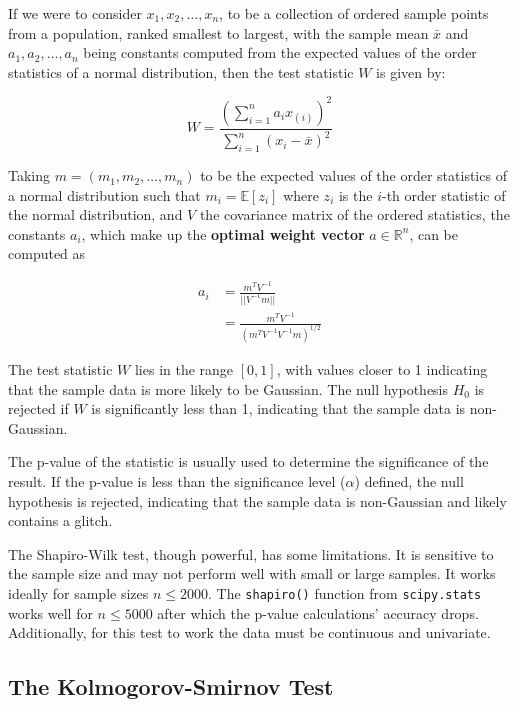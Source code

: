 \documentclass[12pt]{article}
\begin{document}
\medskip
\noindent If we were to consider $x_1, x_2, \ldots, x_n$, to be a collection of ordered sample points from a population, ranked smallest to largest, with the sample mean $\bar{x}$ and $a_1, a_2, \ldots, a_n$ being constants computed from the expected values of the order statistics of a normal distribution, then the test statistic $W$ is given by:

\begin{equation}
    W = \frac{(\sum\limits_{i=1}^{n} a_i x_{(i)})^2}{\sum\limits_{i=1}^{n} (x_i - \bar{x})^2}
    \label{eq:shapiro_wilk_statistic}
\end{equation}

\medskip
\noindent Taking $m = (m_1, m_2, \ldots, m_n)$ to be the expected values of the order statistics of a normal distribution such that $m_i = \mathbb{E}[z_i]$ where $z_i$ is the $i$-th order statistic of the normal distribution, and $V$ the covariance matrix of the ordered statistics, the constants $a_i$, which make up the \textbf{optimal weight vector} $a \in \mathbb{R}^n$, can be computed as

\begin{align}
    a_i &= \frac{m^T V^{-1}}{||V^{-1} m||} \\
        &= \frac{m^T V^{-1}}{(m^T V^{-1}V^{-1}m)^{1/2}}
    \label{eq:shapiro_wilk_constants}
\end{align}

\medskip
\noindent The test statistic $W$ lies in the range $[0, 1]$, with values closer to 1 indicating that the sample data is more likely to be Gaussian. The null hypothesis $H_0$ is rejected if $W$ is significantly less than 1, indicating that the sample data is non-Gaussian.

\medskip
\noindent The p-value of the statistic is usually used to determine the significance of the result. If the p-value is less than the significance level ($\alpha$) defined, the null hypothesis is rejected, indicating that the sample data is non-Gaussian and likely contains a glitch.

\medskip
\noindent The Shapiro-Wilk test, though powerful, has some limitations. It is sensitive to the sample size and may not perform well with small or large samples. It works ideally for sample sizes $n \leq 2000$. The \texttt{shapiro()} function from \texttt{scipy.stats} works well for $n \leq 5000$ after which the p-value calculations' accuracy drops. Additionally, for this test to work the data must be continuous and univariate.

\subsection{The Kolmogorov-Smirnov Test}\label{KolmogorovSmirnov}
\end{document}
